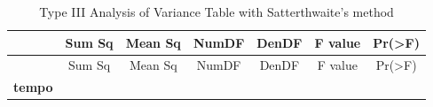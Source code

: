 \documentclass[
]{book}
\begin{document}
\begin{longtable}[]{@{}ccccccc@{}}
\caption{Type III Analysis of Variance Table with Satterthwaite's
method}\tabularnewline
\toprule
\begin{minipage}[b]{0.20\columnwidth}\centering
~\strut
\end{minipage} & \begin{minipage}[b]{0.10\columnwidth}\centering
Sum Sq\strut
\end{minipage} & \begin{minipage}[b]{0.11\columnwidth}\centering
Mean Sq\strut
\end{minipage} & \begin{minipage}[b]{0.09\columnwidth}\centering
NumDF\strut
\end{minipage} & \begin{minipage}[b]{0.09\columnwidth}\centering
DenDF\strut
\end{minipage} & \begin{minipage}[b]{0.11\columnwidth}\centering
F value\strut
\end{minipage} & \begin{minipage}[b]{0.11\columnwidth}\centering
Pr(\textgreater F)\strut
\end{minipage}\tabularnewline
\midrule
\endfirsthead
\toprule
\begin{minipage}[b]{0.20\columnwidth}\centering
~\strut
\end{minipage} & \begin{minipage}[b]{0.10\columnwidth}\centering
Sum Sq\strut
\end{minipage} & \begin{minipage}[b]{0.11\columnwidth}\centering
Mean Sq\strut
\end{minipage} & \begin{minipage}[b]{0.09\columnwidth}\centering
NumDF\strut
\end{minipage} & \begin{minipage}[b]{0.09\columnwidth}\centering
DenDF\strut
\end{minipage} & \begin{minipage}[b]{0.11\columnwidth}\centering
F value\strut
\end{minipage} & \begin{minipage}[b]{0.11\columnwidth}\centering
Pr(\textgreater F)\strut
\end{minipage}\tabularnewline
\midrule
\endhead
\begin{minipage}[t]{0.20\columnwidth}\centering
\textbf{tempo}\strut
\end{minipage} & \begin{minipage}[t]{0.10\columnwidth}\centering

\end{minipage}
\end{longtable}
\end{document}
